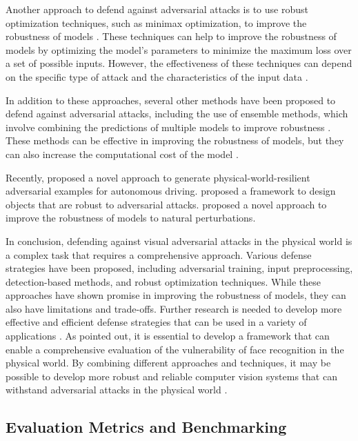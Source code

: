 \documentclass[11pt,a4paper]{article}
\begin{document}
Another approach to defend against adversarial attacks is to use robust optimization techniques, such as minimax optimization, to improve the robustness of models \cite{arxiv:1901.08573}. These techniques can help to improve the robustness of models by optimizing the model's parameters to minimize the maximum loss over a set of possible inputs. However, the effectiveness of these techniques can depend on the specific type of attack and the characteristics of the input data \cite{arxiv:1904.13000}.

In addition to these approaches, several other methods have been proposed to defend against adversarial attacks, including the use of ensemble methods, which involve combining the predictions of multiple models to improve robustness \cite{arxiv:1705.07204}. These methods can be effective in improving the robustness of models, but they can also increase the computational cost of the model \cite{doi:10.1109/asp-dac47756.2020.9045584}.

Recently, \cite{doi:10.1109/cvpr42600.2020.01426} proposed a novel approach to generate physical-world-resilient adversarial examples for autonomous driving. \cite{arxiv:2012.12235} proposed a framework to design objects that are robust to adversarial attacks. \cite{doi:10.1609/aaai.v35i9.16927} proposed a novel approach to improve the robustness of models to natural perturbations.

In conclusion, defending against visual adversarial attacks in the physical world is a complex task that requires a comprehensive approach. Various defense strategies have been proposed, including adversarial training, input preprocessing, detection-based methods, and robust optimization techniques. While these approaches have shown promise in improving the robustness of models, they can also have limitations and trade-offs. Further research is needed to develop more effective and efficient defense strategies that can be used in a variety of applications \cite{doi:10.24963/ijcai.2021/694}. As \cite{arxiv:2209.14262} pointed out, it is essential to develop a framework that can enable a comprehensive evaluation of the vulnerability of face recognition in the physical world. By combining different approaches and techniques, it may be possible to develop more robust and reliable computer vision systems that can withstand adversarial attacks in the physical world \cite{doi:10.1016/j.patcog.2022.109009}.


\subsection{Evaluation Metrics and Benchmarking}
\end{document}
